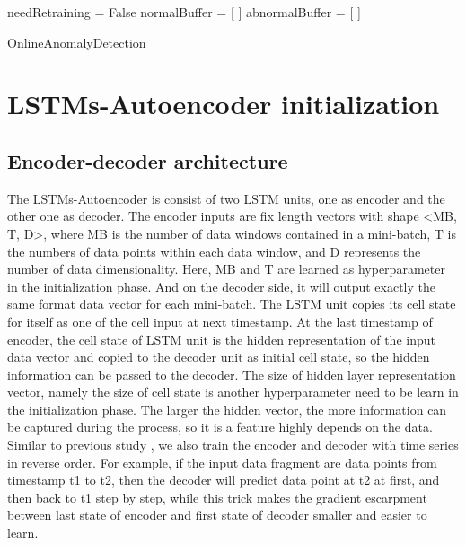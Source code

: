 \begin{algorithm}[h]

\BlankLine 
needRetraining = False\;
normalBuffer = [ ]\;
abnormalBuffer = [ ]\;
\BlankLine 

 \caption{OnlineAnomalyDetection}
\label{alg:pipeline}
\end{algorithm}



\section{LSTMs-Autoencoder initialization}
\label{sec:initialization}

\subsection{Encoder-decoder architecture}
\label{sec:Encoder-decoder architecture}

The LSTMs-Autoencoder is consist of two LSTM units, one as encoder and the other one as decoder. The encoder inputs are fix length vectors with shape <MB, T, D>, where MB is the number of data windows contained in a mini-batch, T is the numbers of data points within each data window, and D represents the number of data dimensionality. Here, MB and T are learned as hyperparameter in the initialization phase. And on the decoder side, it will output exactly the same format data vector for each mini-batch. The LSTM unit copies its cell state for itself as one of the cell input at next timestamp. At the last timestamp of encoder, the cell state of LSTM unit is the hidden representation of the input data vector and copied to the decoder unit as initial cell state, so the hidden information can be passed to the decoder. The size of hidden layer representation vector, namely the size of cell state is another hyperparameter need to be learn in the initialization phase. The larger the hidden vector, the more information can be captured during the process, so it is a feature highly depends on the data. Similar to previous study \cite{seq2seq}, we also train the encoder and decoder with time series in reverse order. For example, if the input data fragment are data points from timestamp t1 to t2, then the decoder will predict data point at t2 at first, and then back to t1 step by step, while this trick makes the gradient escarpment between last state of encoder and first state of decoder smaller and easier to learn. \\

